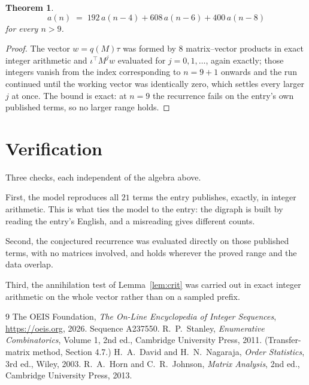 \documentclass[11pt,a4paper]{article}
\theoremstyle{plain}
\newtheorem{theorem}{Theorem}
\theoremstyle{definition}
\begin{document}
\begin{theorem}
\[
a(n)\;=\;192\,a(n-4) + 608\,a(n-6) + 400\,a(n-8)
\]
for every $n>9$.
\end{theorem}

\begin{proof}
The vector $w=q(M)\tau$ was formed by $8$ matrix--vector products in exact integer
arithmetic and $\iota^{\!\top}M^{j}w$ evaluated for $j=0,1,\dots$, again exactly; those
integers vanish from the index corresponding to $n=9+1$ onwards and the run continued
until the working vector was identically zero, which settles every larger $j$ at once. The bound is exact: at $n=9$ the recurrence fails on the entry's own published terms, so no larger range holds.
\end{proof}

\section{Verification}

Three checks, each independent of the algebra above.

First, the model reproduces all $21$ terms the entry publishes, exactly, in integer
arithmetic. This is what ties the model to the entry: the digraph is built by reading the
entry's English, and a misreading gives different counts.

Second, the conjectured recurrence was evaluated directly on those published terms, with no
matrices involved, and holds wherever the proved range and the data overlap.

Third, the annihilation test of Lemma~\ref{lem:crit} was carried out in exact integer
arithmetic on the whole vector rather than on a sampled prefix.

\begin{thebibliography}{9}
 The OEIS Foundation, \emph{The On-Line Encyclopedia of Integer
Sequences}, \url{https://oeis.org}, 2026. Sequence A237550.
 R.~P.~Stanley, \emph{Enumerative Combinatorics}, Volume 1, 2nd ed.,
Cambridge University Press, 2011. (Transfer-matrix method, Section 4.7.)
 H.~A.~David and H.~N.~Nagaraja, \emph{Order Statistics}, 3rd ed., Wiley,
2003.
 R.~A.~Horn and C.~R.~Johnson, \emph{Matrix Analysis}, 2nd ed., Cambridge
University Press, 2013.
\end{thebibliography}
\end{document}
